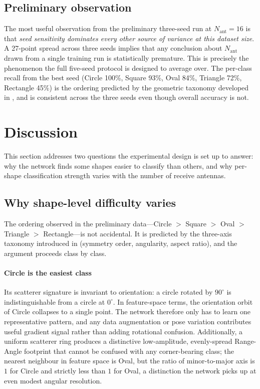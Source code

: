 \documentclass[letterpaper,11pt,leqno]{article}
\begin{document}
\subsection{Preliminary observation}

The most useful observation from the preliminary three-seed run at $N_{\mathrm{ant}}=16$ is that \emph{seed sensitivity dominates every other source of variance at this dataset size}. A 27-point spread across three seeds implies that any conclusion about $N_{\mathrm{ant}}$ drawn from a single training run is statistically premature. This is precisely the phenomenon the full five-seed protocol is designed to average over. The per-class recall from the best seed (Circle 100\%, Square 93\%, Oval 84\%, Triangle 72\%, Rectangle 45\%) is the ordering predicted by the geometric taxonomy developed in , and is consistent across the three seeds even though overall accuracy is not.

\section{Discussion}\label{s:discussion}

This section addresses two questions the experimental design is set up to answer: why the network finds some shapes easier to classify than others, and why per-shape classification strength varies with the number of receive antennas.

\subsection{Why shape-level difficulty varies}

The ordering observed in the preliminary data---Circle $>$ Square $>$ Oval $>$ Triangle $>$ Rectangle---is not accidental. It is predicted by the three-axis taxonomy introduced in  (symmetry order, angularity, aspect ratio), and the argument proceeds class by class.

\paragraph{Circle is the easiest class} Its scatterer signature is invariant to orientation: a circle rotated by $90^\circ$ is indistinguishable from a circle at $0^\circ$. In feature-space terms, the orientation orbit of Circle collapses to a single point. The network therefore only has to learn one representative pattern, and any data augmentation or pose variation contributes useful gradient signal rather than adding rotational confusion. Additionally, a uniform scatterer ring produces a distinctive low-amplitude, evenly-spread Range-Angle footprint that cannot be confused with any corner-bearing class; the nearest neighbour in feature space is Oval, but the ratio of minor-to-major axis is $1$ for Circle and strictly less than $1$ for Oval, a distinction the network picks up at even modest angular resolution.
\end{document}
